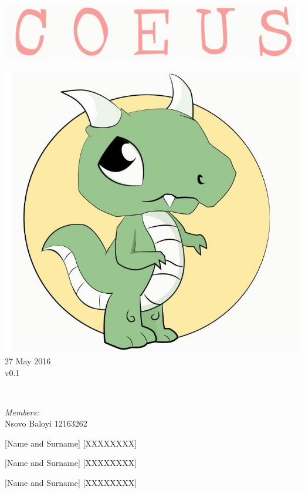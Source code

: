 \documentclass[a4paper,12pt]{article}
\begin{document}
\begin{titlepage}
	\includegraphics[width=\textwidth]{name} \\[1cm]
	\begin{minipage}{0.4\textwidth}
	\begin{flushleft} \large
	\includegraphics[width=\textwidth]{logo} \\[0.5cm]
	{\large 27 May 2016}\\
	{\large v0.1}
	\end{flushleft}
	\end{minipage}
	~
	\begin{minipage}{0.5\textwidth}
	\begin{flushright} \large
	\emph{Members:}\\%
	Nsovo Baloyi 12163262

	[Name and Surname] [XXXXXXXX]
	
	[Name and Surname] [XXXXXXXX]
	
	[Name and Surname] [XXXXXXXX]

	\end{flushright}
	\end{minipage}\\[4cm]
\end{titlepage}
\end{document}
